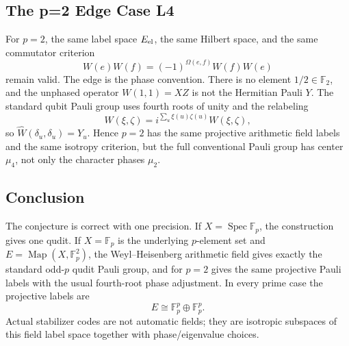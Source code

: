 \subsection{The p=2 Edge Case L4}

For \(p=2\), the same label space \(E_{\rm el}\), the same Hilbert space, and
the same commutator criterion
\[
  W(e)W(f)=(-1)^{\Omega(e,f)}W(f)W(e)
\]
remain valid.  The edge is the phase convention.  There is no element
\(1/2\in\mathbb F_2\), and the unphased operator \(W(1,1)=XZ\) is not the
Hermitian Pauli \(Y\).  The standard qubit Pauli group uses fourth roots of
unity and the relabeling
\[
  \widehat W(\xi,\zeta)=
  i^{\sum_u \xi(u)\zeta(u)}W(\xi,\zeta),
\]
so \(\widehat W(\delta_u,\delta_u)=Y_u\).  Hence \(p=2\) has the same
projective arithmetic field labels and the same isotropy criterion, but the
full conventional Pauli group has center \(\mu_4\), not only the character
phases \(\mu_2\).

\subsection{Conclusion}

The conjecture is correct with one precision.  If \(X=\operatorname{Spec}
\mathbb F_p\), the construction gives one qudit.  If \(X=\mathbb F_p\) is the
underlying \(p\)-element set and \(E=\operatorname{Map}(X,\mathbb F_p^2)\), the
Weyl--Heisenberg arithmetic field gives exactly the standard odd-\(p\) qudit
Pauli group, and for \(p=2\) gives the same projective Pauli labels with the
usual fourth-root phase adjustment.  In every prime case the projective labels
are
\[
  E\cong\mathbb F_p^p\oplus\mathbb F_p^p.
\]
Actual stabilizer codes are not automatic fields; they are isotropic
subspaces of this field label space together with phase/eigenvalue choices.
